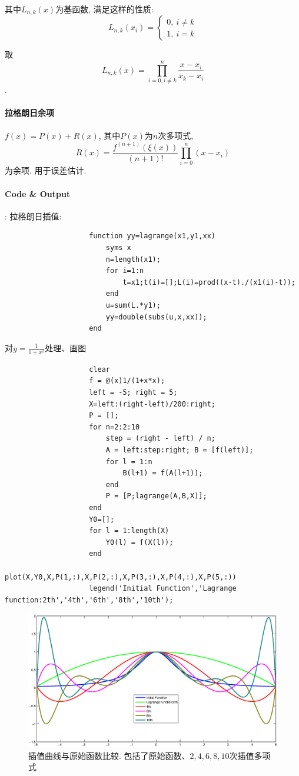 \documentclass{article}
\begin{document}
\begin{CJK*}{UTF8}{song}
		 		其中$L_{n,k}\left(x\right)$为基函数, 满足这样的性质:
		 		$$L_{n,k}\left(x_i\right)=\left\{
		 			\begin{aligned}
		 				0, \ i \neq k \\
		 				1, \ i = k
		 			\end{aligned}
		 		 \right.$$
		 		 
		 		取$$L_{n,k}\left(x\right) = \prod_{i=0,i \neq k}^{n} \frac{x-x_i}{x_k - x_i}$$.
		 	\paragraph{拉格朗日余项}
		 		$f\left(x\right) = P\left(x\right) + R\left(x \right)$, 其中$P\left(x\right)$为$n$次多项式, $$R\left(x\right) = \frac{f^{\left(n+1\right)}\left(\xi\left(x\right)\right)}{\left(n+1\right)!}\prod_{i=0}^{n}\left(x-x_i\right)$$为余项. 用于误差估计.
		 		
		 	\paragraph{Code \& Output}
		 	:\newline
		 		拉格朗日插值:
		 		\begin{lstlisting}
		 			function yy=lagrange(x1,y1,xx)  
		 				syms x  
		 				n=length(x1);  
		 				for i=1:n  
		 					t=x1;t(i)=[];L(i)=prod((x-t)./(x1(i)-t)); 
		 				end  
		 				u=sum(L.*y1);  
		 				yy=double(subs(u,x,xx));
		 			end  
		 		\end{lstlisting}
		 		
		 		对$y=\frac{1}{1+x^2}$处理、画图
		 		\begin{lstlisting}
		 			clear
		 			f = @(x)1/(1+x*x);
		 			left = -5; right = 5;
		 			X=left:(right-left)/200:right;
		 			P = [];
		 			for n=2:2:10
		 				step = (right - left) / n;
		 				A = left:step:right; B = [f(left)];
		 				for l = 1:n
		 					B(l+1) = f(A(l+1));
		 				end
		 				P = [P;lagrange(A,B,X)];
		 			end
		 			Y0=[];
		 			for l = 1:length(X)
		 				Y0(l) = f(X(l));
		 			end
		 			plot(X,Y0,X,P(1,:),X,P(2,:),X,P(3,:),X,P(4,:),X,P(5,:))
		 			legend('Initial Function','Lagrange function:2th','4th','6th','8th','10th');
		 		\end{lstlisting}
		 		\begin{figure}[H]
		 			\centering
		 			\includegraphics[width=1.0\textwidth]{../chapter3_1.eps}
		 			\caption{插值曲线与原始函数比较. 包括了原始函数、$2,4,6,8,10$次插值多项式}
		 			\label{img_chapter3_1}
		 		\end{figure}
	 			

\end{CJK*}
\end{document}
